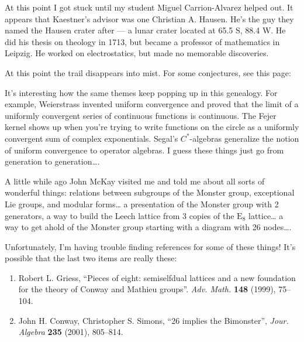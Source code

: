 \documentclass{article}
\def\tightlist{}
\renewcommand{\texttt}[1]{%
  \begingroup
  \ttfamily
  \begingroup\lccode`~=`/\lowercase{\endgroup\def~}{/\discretionary{}{}{}}%
  \begingroup\lccode`~=`[\lowercase{\endgroup\def~}{[\discretionary{}{}{}}%
  \begingroup\lccode`~=`.\lowercase{\endgroup\def~}{.\discretionary{}{}{}}%
  \catcode`/=\active\catcode`[=\active\catcode`.=\active
  \scantokens{#1\noexpand}%
  \endgroup
}
\begin{document}
At this point I got stuck until my student Miguel Carrion-Alvarez helped
out. It appears that Kaestner's advisor was one Christian A. Hausen.
He's the guy they named the Hausen crater after --- a lunar crater
located at 65.5 S, 88.4 W. He did his thesis on theology in 1713, but
became a professor of mathematics in Leipzig. He worked on
electrostatics, but made no memorable discoveries.

At this point the trail disappears into mist. For some conjectures, see
this page:


It's interesting how the same themes keep popping up in this genealogy.
For example, Weierstrass invented uniform convergence and proved that
the limit of a uniformly convergent series of continuous functions is
continuous. The Fejer kernel shows up when you're trying to write
functions on the circle as a uniformly convergent sum of complex
exponentials. Segal's \(C^*\)-algebras generalize the notion of uniform
convergence to operator algebras. I guess these things just go from
generation to generation\ldots.

A little while ago John McKay visited me and told me about all sorts of
wonderful things: relations between subgroups of the Monster group,
exceptional Lie groups, and modular forms\ldots{} a presentation of the
Monster group with 2 generators, a way to build the Leech lattice from 3
copies of the \(\mathrm{E}_8\) lattice\ldots{} a way to get ahold of the
Monster group starting with a diagram with 26 nodes\ldots.

Unfortunately, I'm having trouble finding references for some of these
things! It's possible that the last two items are really these:

\begin{enumerate}
\def\labelenumi{\arabic{enumi})}
\setcounter{enumi}{5}
\item
  Robert L. Griess, ``Pieces of eight: semiselfdual lattices and a new
  foundation for the theory of Conway and Mathieu groups''. \emph{Adv.
  Math.} \textbf{148} (1999), 75--104.
\item
  John H. Conway, Christopher S. Simons, ``26 implies the Bimonster'',
  \emph{Jour. Algebra} \textbf{235} (2001), 805--814.
\end{enumerate}
\end{document}
